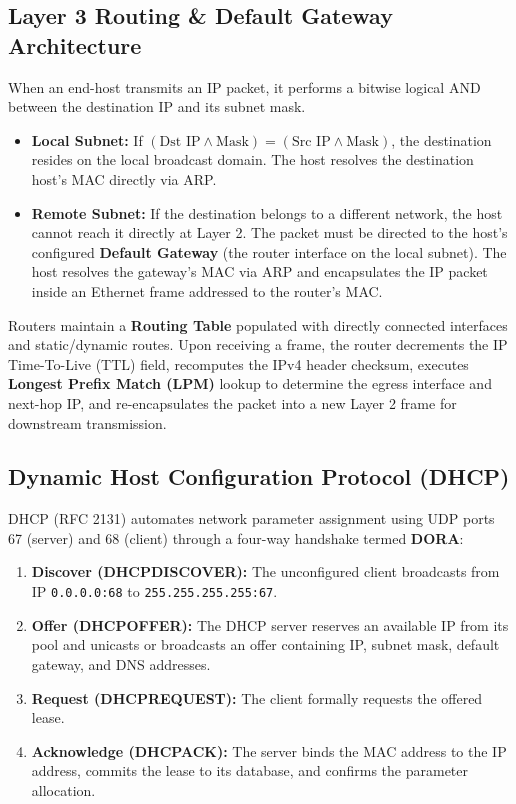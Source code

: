 \documentclass[12pt, a4paper]{article}
\begin{document}
\subsection{Layer 3 Routing \& Default Gateway Architecture}
When an end-host transmits an IP packet, it performs a bitwise logical AND between the destination IP and its subnet mask.
\begin{itemize}
    \item \textbf{Local Subnet:} If $(\text{Dst IP} \land \text{Mask}) = (\text{Src IP} \land \text{Mask})$, the destination resides on the local broadcast domain. The host resolves the destination host's MAC directly via ARP.
    \item \textbf{Remote Subnet:} If the destination belongs to a different network, the host cannot reach it directly at Layer 2. The packet must be directed to the host's configured \textbf{Default Gateway} (the router interface on the local subnet). The host resolves the gateway's MAC via ARP and encapsulates the IP packet inside an Ethernet frame addressed to the router's MAC.
\end{itemize}

Routers maintain a \textbf{Routing Table} populated with directly connected interfaces and static/dynamic routes. Upon receiving a frame, the router decrements the IP Time-To-Live (TTL) field, recomputes the IPv4 header checksum, executes \textbf{Longest Prefix Match (LPM)} lookup to determine the egress interface and next-hop IP, and re-encapsulates the packet into a new Layer 2 frame for downstream transmission.

\subsection{Dynamic Host Configuration Protocol (DHCP)}
DHCP (RFC 2131) automates network parameter assignment using UDP ports 67 (server) and 68 (client) through a four-way handshake termed \textbf{DORA}:
\begin{enumerate}
    \item \textbf{Discover (DHCPDISCOVER):} The unconfigured client broadcasts from IP \texttt{0.0.0.0:68} to \texttt{255.255.255.255:67}.
    \item \textbf{Offer (DHCPOFFER):} The DHCP server reserves an available IP from its pool and unicasts or broadcasts an offer containing IP, subnet mask, default gateway, and DNS addresses.
    \item \textbf{Request (DHCPREQUEST):} The client formally requests the offered lease.
    \item \textbf{Acknowledge (DHCPACK):} The server binds the MAC address to the IP address, commits the lease to its database, and confirms the parameter allocation.
\end{enumerate}
\end{document}
